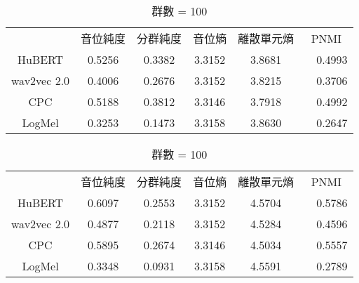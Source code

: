         \begin{table}[!htbp]
            \centering
            \begin{subtable}[t]{\textwidth}
                \centering
                \begin{tabular}{cccccc}
                                & 音位純度 & 分群純度 & 音位熵 & 離散單元熵 &    PNMI \\
                    HuBERT      &   0.5256 &   0.3382 & 3.3152 &     3.8681 &　0.4993 \\   %
                    wav2vec 2.0 &   0.4006 &   0.2676 & 3.3152 &     3.8215 &　0.3706 \\   %
                    CPC         &   0.5188 &   0.3812 & 3.3146 &     3.7918 &　0.4992 \\   %
                    LogMel      &   0.3253 &   0.1473 & 3.3158 &     3.8630 &　0.2647 \\   %
                \end{tabular}
                \caption{群數 = 50}
                \label{tab:ch3-clu050}
            \end{subtable}        

            \vspace{0.5cm}        

            \begin{subtable}[t]{\textwidth}
                \centering
                \begin{tabular}{cccccc}
                                & 音位純度 & 分群純度 & 音位熵 & 離散單元熵 &    PNMI \\
                    HuBERT      &   0.6097 &   0.2553 & 3.3152 &     4.5704 &　0.5786 \\   %
                    wav2vec 2.0 &   0.4877 &   0.2118 & 3.3152 &     4.5284 &　0.4596 \\   %
                    CPC         &   0.5895 &   0.2674 & 3.3146 &     4.5034 &　0.5557 \\   %
                    LogMel      &   0.3348 &   0.0931 & 3.3158 &     4.5591 &　0.2789 \\   %
                \end{tabular}
                \caption{群數 = 100}
                \label{tab:ch3-clu100}
            \end{subtable}        

            \vspace{0.5cm}        


\end{table}
